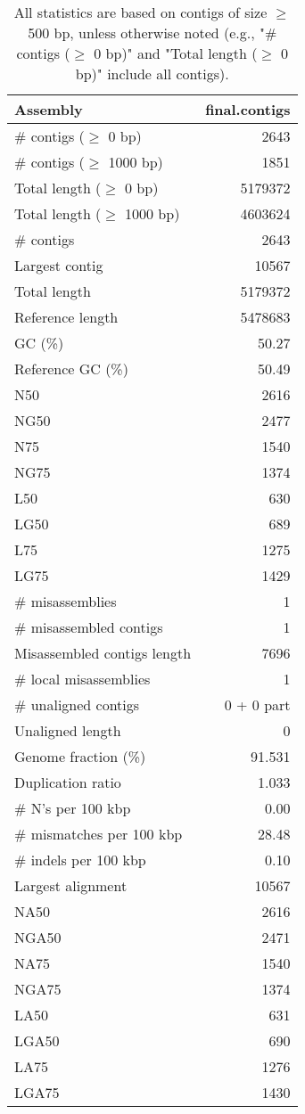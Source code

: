 \documentclass[12pt,a4paper]{article}
\begin{document}
\begin{table}[ht]
\begin{center}
\caption{All statistics are based on contigs of size $\geq$ 500 bp, unless otherwise noted (e.g., "\# contigs ($\geq$ 0 bp)" and "Total length ($\geq$ 0 bp)" include all contigs).}
\begin{tabular}{|l*{1}{|r}|}
\hline
Assembly & final.contigs \\ \hline
\# contigs ($\geq$ 0 bp) & 2643 \\ \hline
\# contigs ($\geq$ 1000 bp) & 1851 \\ \hline
Total length ($\geq$ 0 bp) & 5179372 \\ \hline
Total length ($\geq$ 1000 bp) & 4603624 \\ \hline
\# contigs & 2643 \\ \hline
Largest contig & 10567 \\ \hline
Total length & 5179372 \\ \hline
Reference length & 5478683 \\ \hline
GC (\%) & 50.27 \\ \hline
Reference GC (\%) & 50.49 \\ \hline
N50 & 2616 \\ \hline
NG50 & 2477 \\ \hline
N75 & 1540 \\ \hline
NG75 & 1374 \\ \hline
L50 & 630 \\ \hline
LG50 & 689 \\ \hline
L75 & 1275 \\ \hline
LG75 & 1429 \\ \hline
\# misassemblies & 1 \\ \hline
\# misassembled contigs & 1 \\ \hline
Misassembled contigs length & 7696 \\ \hline
\# local misassemblies & 1 \\ \hline
\# unaligned contigs & 0 + 0 part \\ \hline
Unaligned length & 0 \\ \hline
Genome fraction (\%) & 91.531 \\ \hline
Duplication ratio & 1.033 \\ \hline
\# N's per 100 kbp & 0.00 \\ \hline
\# mismatches per 100 kbp & 28.48 \\ \hline
\# indels per 100 kbp & 0.10 \\ \hline
Largest alignment & 10567 \\ \hline
NA50 & 2616 \\ \hline
NGA50 & 2471 \\ \hline
NA75 & 1540 \\ \hline
NGA75 & 1374 \\ \hline
LA50 & 631 \\ \hline
LGA50 & 690 \\ \hline
LA75 & 1276 \\ \hline
LGA75 & 1430 \\ \hline
\end{tabular}
\end{center}
\end{table}
\end{document}
